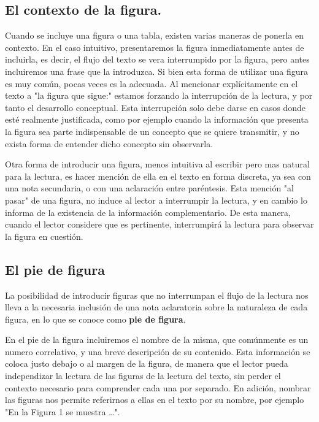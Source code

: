 \documentclass[11pt]{article}
\begin{document}
\subsection{El contexto de la figura.}
\label{sec-3-2}

Cuando se incluye una figura o una tabla, existen varias maneras de ponerla en contexto. En el caso intuitivo,
presentaremos la figura inmediatamente antes de incluirla, es decir, el flujo del texto se vera interrumpido
por la figura, pero antes incluiremos una frase que la introduzca.
Si bien esta forma de utilizar una figura es muy común, pocas veces es la adecuada. Al mencionar explícitamente
en el texto a "la figura que sigue:" estamos forzando la interrupción de la lectura, y por tanto el desarrollo
conceptual. Esta interrupción solo debe darse en casos donde esté realmente justificada, como por ejemplo cuando
la información que presenta la figura sea parte indispensable de un concepto que se quiere transmitir, y no exista
forma de entender dicho concepto sin observarla.

Otra forma de introducir una figura, menos intuitiva al escribir pero mas natural para la lectura, es hacer mención
de ella en el texto en forma discreta, ya sea con una nota secundaria, o con una aclaración entre paréntesis. Esta
mención "al pasar" de una figura, no induce al lector a interrumpir la lectura, y en cambio lo informa de la existencia
de la información complementario. De esta manera, cuando el lector considere que es pertinente, interrumpirá la lectura
para observar la figura en cuestión.

\subsection{El pie de figura}
\label{sec-3-3}

La posibilidad de introducir figuras que no interrumpan el flujo de la lectura nos lleva a la necesaria inclusión de una
nota aclaratoria sobre la naturaleza de cada figura, en lo que se conoce como \textbf{pie de figura}.

En el pie de la figura incluiremos el nombre de la misma, que comúnmente es un numero correlativo, y una breve descripción
de su contenido. Esta información se coloca justo debajo o al margen de la figura, de manera que el lector pueda
independizar la lectura de las figuras de la lectura del texto, sin perder el contexto necesario
para comprender cada una por separado. En adición, nombrar las figuras nos permite referirnos a ellas en el texto
por su nombre, por ejemplo "En la Figura 1 se muestra \ldots{}".
\end{document}
